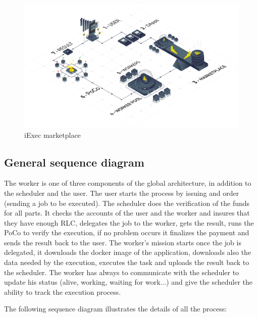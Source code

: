         \begin{figure}[!h]
            \includegraphics[width=\columnwidth]{4-Requirements/figs/iexec-marketplace.png}
            \caption{iExec marketplace}
        \end{figure}

    \subsection{General sequence diagram}
        The worker is one of three components of the global architecture, in addition to the scheduler and the user.
        The user starts the process by issuing and order (sending a job to be executed). The scheduler does the verification
        of the funds for all parts. It checks the accounts of the user and the worker and insures that they have enough RLC,
        delegates the job to the worker, gets the result, runs the PoCo to verify the execution, if no problem occurs it
        finalizes the payment and sends the result back to the user. The worker's mission starts once the job is delegated,
        it downloads the docker image of the application, downloads also the data needed by the execution, executes the task
        and uploads the result back to the scheduler. The worker has always to communicate with the scheduler to update his
        status (alive, working, waiting for work...) and give the scheduler the ability to track the execution process.\newline

        The following sequence diagram illustrates the details of all the process:
        
        \clearpage

